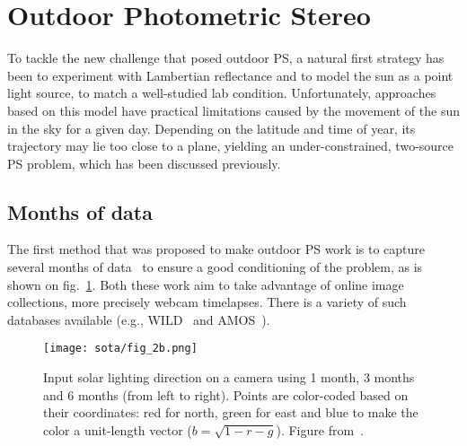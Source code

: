 

\section{Outdoor Photometric Stereo}

To tackle the new challenge that posed outdoor PS, a natural first strategy has been to experiment with Lambertian reflectance and to model the sun as a point light source, to match a well-studied lab condition. Unfortunately, approaches based on this model have practical limitations caused by the movement of the sun in the sky for a given day. Depending on the latitude and time of year, its trajectory may lie too close to a plane, yielding an under-constrained, two-source PS problem, which has been discussed previously.

\subsection{Months of data}
The first method that was proposed to make outdoor PS work is to capture several months of data~\cite{ackermann-cvpr-12,abrams-eccv-12} to ensure a good conditioning of the problem, as is shown on fig.~\ref{fig:abrams-sunpath}. Both these work aim to take advantage of online image collections, more precisely webcam timelapses. There is a variety of such databases available (e.g., WILD~\cite{narasimhan-eccv-06} and AMOS~\cite{jacobs-cvpr-2007}).

\begin{figure}
\centering
\texttt{[image: sota/fig\_2b.png]}
\caption{Input solar lighting direction on a camera using 1 month, 3 months and 6 months (from left to right). Points are color-coded based on their coordinates: red for north, green for east and blue to make the color a unit-length vector ($b = \sqrt{1 - r - g}$). Figure from~\cite{abrams-eccv-12}.}
\label{fig:abrams-sunpath}
\end{figure}

